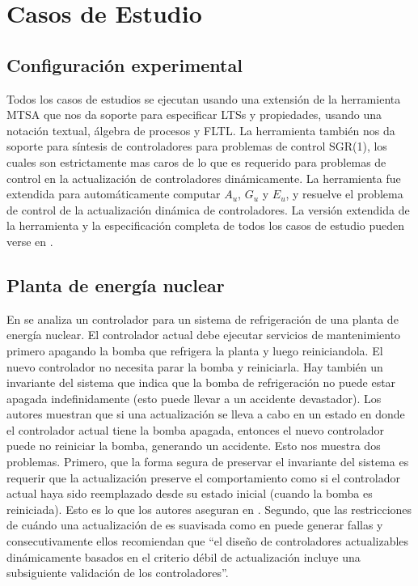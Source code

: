 \section{Casos de Estudio}

\subsection*{Configuración experimental}

Todos los casos de estudios se ejecutan usando una extensión de la herramienta MTSA \cite{4639371} que nos da soporte
para especificar LTSs y propiedades, usando una notación textual, álgebra de procesos y FLTL. La herramienta también nos 
da soporte para síntesis de controladores para problemas de control SGR(1), los cuales son estrictamente mas caros de lo
que es requerido para problemas de control en la actualización de controladores dinámicamente. La herramienta fue 
extendida para automáticamente computar $A_u$, $G_u$ y $E_u$, y resuelve el problema de control de la actualización
dinámica de controladores. La versión extendida de la herramienta y la especificación completa de todos los casos de
estudio pueden verse en \cite{}.

\subsection{Planta de energía nuclear}

En \cite{PanzicaLaManna:2013:FCC:2487336.2487349} se analiza un controlador para un sistema de refrigeración de una
planta de energía nuclear. El controlador actual debe ejecutar servicios de mantenimiento primero apagando la
bomba que refrigera la planta y luego reiniciandola. El nuevo controlador no necesita parar la bomba y reiniciarla. Hay
también un invariante del sistema que indica que la bomba de refrigeración no puede estar apagada indefinidamente (esto
puede llevar a un accidente devastador). Los autores muestran que si una actualización se lleva a cabo en un estado en
donde el controlador actual tiene la bomba apagada, entonces el nuevo controlador puede no reiniciar la bomba, generando
un accidente. Esto nos muestra dos problemas. Primero, que la forma segura de preservar el invariante del sistema es
requerir que la actualización preserve el comportamiento como si el controlador actual haya sido reemplazado desde su
estado inicial (cuando la bomba es reiniciada). Esto es lo que los autores aseguran en \cite{6224401}. Segundo, que las
restricciones de cuándo una actualización de \cite{6224401} es suavisada como en \cite{PanzicaLaManna:2013:FCC:2487336.2487349} 
puede generar fallas y consecutivamente ellos recomiendan que ``el diseño de controladores actualizables
dinámicamente basados en el criterio débil de  actualización incluye una subsiguiente validación de los controladores''.


